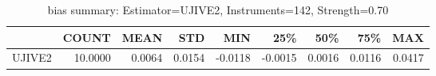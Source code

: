 \begin{table}[ht]
\centering
\caption{bias summary: Estimator=UJIVE2, Instruments=142, Strength=0.70}
\begin{tabular}{lrrrrrrrr}
\toprule
 & COUNT & MEAN & STD & MIN & 25\% & 50\% & 75\% & MAX \\
\midrule
UJIVE2 & 10.0000 & 0.0064 & 0.0154 & -0.0118 & -0.0015 & 0.0016 & 0.0116 & 0.0417 \\
\bottomrule
\end{tabular}
\end{table}
